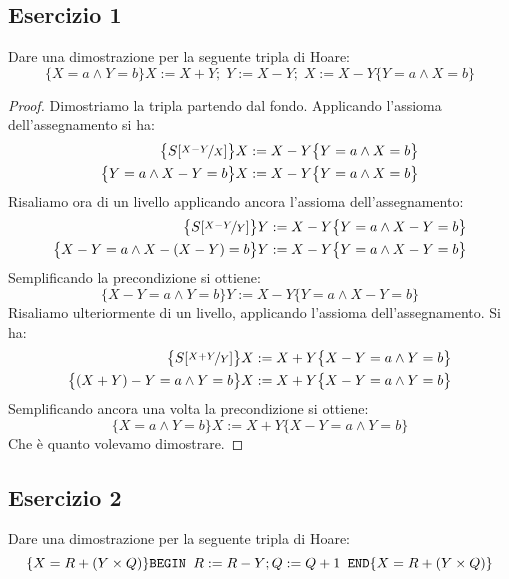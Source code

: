 \subsection{Esercizio 1}
Dare una dimostrazione per la seguente tripla di Hoare:
\[ \{X=a  \land Y=b\}  X:=X+Y; \; Y:=X-Y; \; X:=X-Y  \{Y=a  \land  X=b\} \]

\begin{proof}
Dimostriamo la tripla partendo dal fondo. Applicando l'assioma dell'assegnamento si ha:
\begin{align*}
  \bigl\{S[\nicefrac{X-Y}{X}] \bigr\} &  X:=X-Y  \bigl\{Y=a  \land  X=b\bigr\}\\
  \bigl\{Y=a  \land X-Y=b \bigr\} & X:=X-Y  \bigl\{Y=a  \land  X=b\bigr\}
\end{align*} 
Risaliamo ora di un livello applicando ancora l'assioma dell'assegnamento:
\begin{align*}
  \bigl\{S[\nicefrac{X-Y}{Y}] \bigr\} & Y:=X-Y \bigl\{Y=a  \land  X-Y=b\bigr\}\\
  \bigl\{X-Y=a  \land X-(X-Y)=b \bigr\} & Y:=X-Y \bigl\{Y=a  \land  X-Y=b\bigr\}
\end{align*}
Semplificando la precondizione si ottiene:
\[ \bigl\{X-Y=a  \land Y=b \bigr\}  Y:=X-Y  \bigl\{Y=a  \land  X-Y=b\bigr\} \]
Risaliamo ulteriormente di un livello, applicando l'assioma dell'assegnamento. Si ha:
\begin{align*}
  \bigl\{S[\nicefrac{X+Y}{Y}] \bigr\} & X:=X+Y \bigl\{X-Y=a  \land  Y=b\bigr\}\\
  \bigl\{(X+Y)-Y=a  \land Y=b \bigr\} & X:=X+Y \bigl\{X-Y=a  \land  Y=b\bigr\}
\end{align*}
Semplificando ancora una volta la precondizione si ottiene:
\[ \bigl\{X=a  \land Y=b \bigr\}  X:=X+Y  \bigl\{X-Y=a  \land  Y=b\bigr\} \]
Che è quanto volevamo dimostrare.
\end{proof}

\subsection{Esercizio 2}
Dare una dimostrazione per la seguente tripla di Hoare:
\[ 
  \{X=R+(Y \times Q) \} \text{\texttt{BEGIN }} R:=R-Y; Q:=Q+1
  \text{\texttt{ END}} \{X=R+(Y \times Q)\} 
\]

